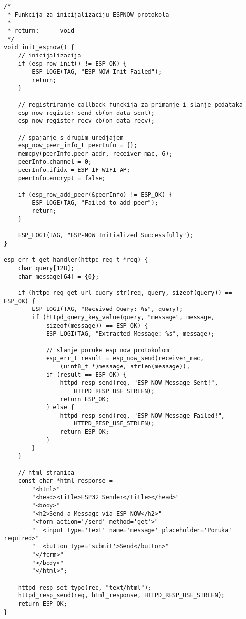 \documentclass[seminarskirad]{fer}
\begin{document}
\begin{lstlisting}[caption=ESP-NOW sender]
/*
 * Funkcija za inicijalizaciju ESPNOW protokola
 * 
 * return:      void
 */
void init_espnow() {
    // inicijalizacija
    if (esp_now_init() != ESP_OK) {
        ESP_LOGE(TAG, "ESP-NOW Init Failed");
        return;
    }

    // registriranje callback funckija za primanje i slanje podataka
    esp_now_register_send_cb(on_data_sent);
    esp_now_register_recv_cb(on_data_recv);

    // spajanje s drugim uredjajem
    esp_now_peer_info_t peerInfo = {};
    memcpy(peerInfo.peer_addr, receiver_mac, 6);
    peerInfo.channel = 0;
    peerInfo.ifidx = ESP_IF_WIFI_AP;
    peerInfo.encrypt = false;

    if (esp_now_add_peer(&peerInfo) != ESP_OK) {
        ESP_LOGE(TAG, "Failed to add peer");
        return;
    }

    ESP_LOGI(TAG, "ESP-NOW Initialized Successfully");
}

esp_err_t get_handler(httpd_req_t *req) {
    char query[128];
    char message[64] = {0};

    if (httpd_req_get_url_query_str(req, query, sizeof(query)) == ESP_OK) {
        ESP_LOGI(TAG, "Received Query: %s", query);
        if (httpd_query_key_value(query, "message", message, 
            sizeof(message)) == ESP_OK) {
            ESP_LOGI(TAG, "Extracted Message: %s", message);

            // slanje poruke esp now protokolom
            esp_err_t result = esp_now_send(receiver_mac, 
                (uint8_t *)message, strlen(message));
            if (result == ESP_OK) {
                httpd_resp_send(req, "ESP-NOW Message Sent!", 
                    HTTPD_RESP_USE_STRLEN);
                return ESP_OK;
            } else {
                httpd_resp_send(req, "ESP-NOW Message Failed!", 
                    HTTPD_RESP_USE_STRLEN);
                return ESP_OK;
            }
        }
    }

    // html stranica
    const char *html_response =
        "<html>"
        "<head><title>ESP32 Sender</title></head>"
        "<body>"
        "<h2>Send a Message via ESP-NOW</h2>"
        "<form action='/send' method='get'>"
        "  <input type='text' name='message' placeholder='Poruka' required>"
        "  <button type='submit'>Send</button>"
        "</form>"
        "</body>"
        "</html>";

    httpd_resp_set_type(req, "text/html");
    httpd_resp_send(req, html_response, HTTPD_RESP_USE_STRLEN);
    return ESP_OK;
}


\end{lstlisting}
\end{document}
